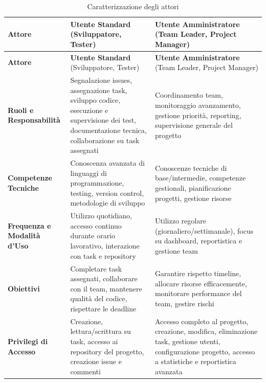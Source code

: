 \renewcommand{\arraystretch}{1.5}
\setlength{\tabcolsep}{8pt}


\begin{longtable}{|p{3.5cm}|p{5.5cm}|p{5.5cm}|}
\caption{Caratterizzazione degli attori}
\label{tab:caratterizzazione-attori} \\

\hline
\rowcolor{headersBlue!30}
\textbf{Attore} & \textbf{Utente Standard} (Sviluppatore, Tester) & \textbf{Utente Amministratore} (Team Leader, Project Manager) \\
\hline
\endfirsthead

\hline
\rowcolor{headersBlue!30}
\textbf{Attore} & \textbf{Utente Standard} (Sviluppatore, Tester) & \textbf{Utente Amministratore} (Team Leader, Project Manager) \\
\hline
\endhead

\hline
\textbf{Ruoli e Responsabilità} &
Segnalazione issues, assegnazione task, sviluppo codice, esecuzione e supervisione dei test, documentazione tecnica, collaborazione su task assegnati &
Coordinamento team, monitoraggio avanzamento, gestione priorità, reporting, supervisione generale del progetto \\
\hline

\textbf{Competenze Tecniche} &
Conoscenza avanzata di linguaggi di programmazione, testing, version control, metodologie di sviluppo &
Conoscenze tecniche di base/intermedie, competenze gestionali, pianificazione progetti, gestione risorse \\
\hline

\textbf{Frequenza e Modalità d'Uso} &
Utilizzo quotidiano, accesso continuo durante orario lavorativo, interazione con task e repository &
Utilizzo regolare (giornaliero/settimanale), focus su dashboard, reportistica e gestione team \\
\hline

\textbf{Obiettivi} &
Completare task assegnati, collaborare con il team, mantenere qualità del codice, rispettare le deadline &
Garantire rispetto timeline, allocare risorse efficacemente, monitorare performance del team, gestire rischi \\
\hline

\textbf{Privilegi di Accesso} &
Creazione, lettura/scrittura su task, accesso ai repository del progetto, creazione issue e commenti &
Accesso completo al progetto, creazione, modifica, eliminazione task, gestione utenti, configurazione progetto, accesso a statistiche e reportistica avanzata \\
\hline

\end{longtable}